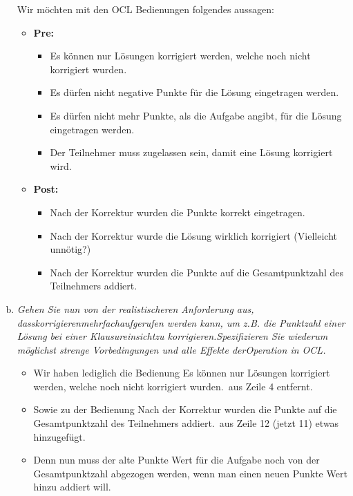 \begin{enumerate}[(a)]
    Wir möchten mit den OCL Bedienungen folgendes aussagen:
    \begin{itemize}
        \item \textbf{Pre:}
        \begin{itemize}
            \item Es können nur Lösungen korrigiert werden, welche noch nicht korrigiert wurden.
            \item Es dürfen nicht negative Punkte für die Lösung eingetragen werden.
            \item Es dürfen nicht mehr Punkte, als die Aufgabe angibt, für die Lösung eingetragen werden.
            \item Der Teilnehmer muss zugelassen sein, damit eine Lösung korrigiert wird.
        \end{itemize}
        
        \item \textbf{Post:}
        \begin{itemize}
            \item Nach der Korrektur wurden die Punkte korrekt eingetragen.
            \item Nach der Korrektur wurde die Lösung wirklich korrigiert (Vielleicht unnötig?)
            \item Nach der Korrektur wurden die Punkte auf die Gesamtpunktzahl des Teilnehmers addiert.
        \end{itemize}
        
    
    \end{itemize}



    \item {\itshape Gehen Sie nun von der realistischeren Anforderung aus, dasskorrigierenmehrfachaufgerufen werden kann, um z.B. die Punktzahl einer Lösung bei einer Klausureinsichtzu korrigieren.Spezifizieren  Sie  wiederum  möglichst  strenge  Vorbedingungen  und  alle  Effekte  derOperation in OCL.}
    \begin{itemize}
        \item Wir haben lediglich die Bedienung \dq Es können nur Lösungen korrigiert werden, welche noch nicht korrigiert wurden.\dq \ aus Zeile 4 entfernt.
        \item Sowie zu der Bedienung \dq Nach der Korrektur wurden die Punkte auf die Gesamtpunktzahl des Teilnehmers addiert.\dq \ aus Zeile 12 (jetzt 11) etwas hinzugefügt.
        \item Denn nun muss der alte Punkte Wert für die Aufgabe noch von der Gesamtpunktzahl abgezogen werden, wenn man einen neuen Punkte Wert hinzu addiert will.
    \end{itemize}
    


\end{enumerate}
